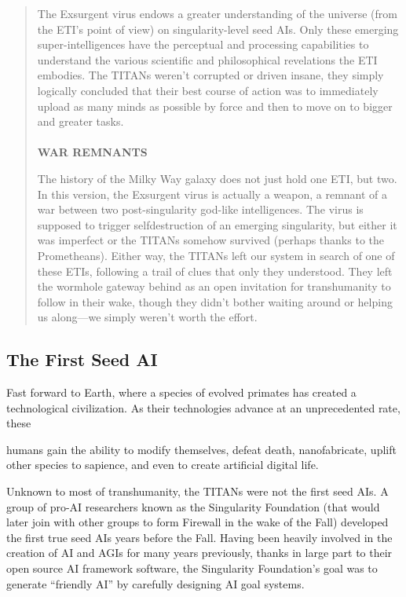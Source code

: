\begin{quotation}
The Exsurgent virus endows a greater understanding of the universe (from the ETI’s point of view) on singularity-level seed AIs. Only these emerging super-intelligences have the perceptual and processing capabilities to understand the various scientific and philosophical revelations the ETI embodies. The TITANs weren’t corrupted or driven insane, they simply logically concluded that their best course of action was to immediately upload as many minds as possible by force and then to move on to bigger and greater tasks. \\ \\ \textbf{WAR REMNANTS} 

The history of the Milky Way galaxy does not just hold one ETI, but two. In this version, the Exsurgent virus is actually a weapon, a remnant of a war between two post-singularity god-like intelligences. The virus is supposed to trigger selfdestruction of an emerging singularity, but either it was imperfect or the TITANs somehow survived (perhaps thanks to the Prometheans). Either way, the TITANs left our system in search of one of these ETIs, following a trail of clues that only they understood. They left the wormhole gateway behind as an open invitation for transhumanity to follow in their wake, though they didn’t bother waiting around or helping us along—we simply weren’t worth the effort. \end{quotation} 



\subsection{The First Seed AI} 

Fast forward to Earth, where a species of evolved primates has created a technological civilization. As their technologies advance at an unprecedented rate, these 

humans gain the ability to modify themselves, defeat death, nanofabricate, uplift other species to sapience, and even to create artificial digital life. 

Unknown to most of transhumanity, the TITANs were not the first seed AIs. A group of pro-AI researchers known as the Singularity Foundation (that would later join with other groups to form Firewall in the wake of the Fall) developed the first true seed AIs years before the Fall. Having been heavily involved in the creation of AI and AGIs for many years previously, thanks in large part to their open source AI framework software, the Singularity Foundation's goal was to generate ``friendly AI'' by carefully designing AI goal systems. 

